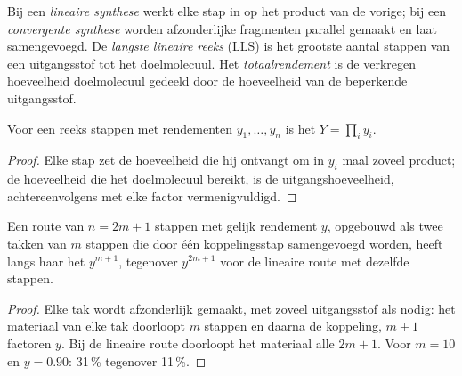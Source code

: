 \begin{definition}\label{def:b3:total-synthesis:architecture}
Bij een \emph{lineaire synthese} werkt elke stap
in op het product van de vorige; bij een
\emph{convergente synthese} worden
afzonderlijke fragmenten parallel gemaakt en laat samengevoegd. De
\emph{langste lineaire reeks} (LLS) is het
grootste aantal stappen van een uitgangsstof tot het doelmolecuul. Het
\emph{totaalrendement} is de verkregen hoeveelheid
doelmolecuul gedeeld door de hoeveelheid van de beperkende uitgangsstof.
\end{definition}

\begin{proposition}[Totaalrendement]\label{prop:b3:total-synthesis:overall-yield}
Voor een reeks stappen met rendementen $y_1, \dots, y_n$ is het  $Y = \prod_i y_i$.
\end{proposition}

\begin{proof}
Elke stap zet de hoeveelheid die hij ontvangt om in $y_i$ maal zoveel
product; de hoeveelheid die het doelmolecuul bereikt, is de
uitgangshoeveelheid, achtereenvolgens met elke factor vermenigvuldigd.
\end{proof}

\begin{proposition}[Convergentie]\label{prop:b3:total-synthesis:convergent}
Een route van $n = 2m + 1$ stappen met gelijk rendement $y$, opgebouwd als twee takken van $m$ stappen die door
één koppelingsstap samengevoegd worden, heeft langs haar  het  $y^{m+1}$,
tegenover $y^{2m+1}$ voor de lineaire route met dezelfde stappen.
\end{proposition}

\begin{proof}
Elke tak wordt afzonderlijk gemaakt, met zoveel uitgangsstof als nodig:
het materiaal van elke tak doorloopt $m$ stappen en daarna de koppeling, $m + 1$
factoren $y$. Bij de lineaire route doorloopt het materiaal alle $2m + 1$. Voor $m = 10$
en $y = 0.90$: 31\,\% tegenover 11\,\%.
\end{proof}

